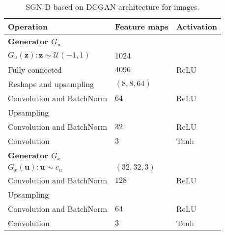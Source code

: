 \begin{table}
	\scriptsize %
	\centering
	\caption{SGN-D based on DCGAN architecture for images.}
	\begin{tabular}{ p{5cm}|p{2cm}|p{1.5cm}} 
		\toprule
		\textbf{Operation} & \textbf{Feature maps}  		& \textbf{Activation}  \\
		\midrule
		\textbf{Generator $G_u$} & &  \\ 
		$G_u(\mathbf{z}):\mathbf{z} \sim \mathcal{U}(-1,1)$ & 1024\\ 
		Fully connected & $4096$ & ReLU \\ 
		Reshape and upsampling & $(8,8,64)$ &  \\ 
		Convolution and BatchNorm & $64$ & ReLU \\ 
		Upsampling & &  \\ 
		Convolution and BatchNorm & $32$ & ReLU \\ 
		Convolution & $3$ & Tanh \\  \hline
		\textbf{Generator $G_x$} &&   \\ 
		$G_x(\mathbf{u}):\mathbf{u} \sim c_u $ & $(32,32,3)$ \\ 
		Convolution and BatchNorm & $128$ & ReLU \\ 
		Upsampling & &  \\ 
		Convolution and BatchNorm & $64$ & ReLU \\ 
		Convolution & $3$ & Tanh \\  \hline
		

\end{tabular}
\end{table}
